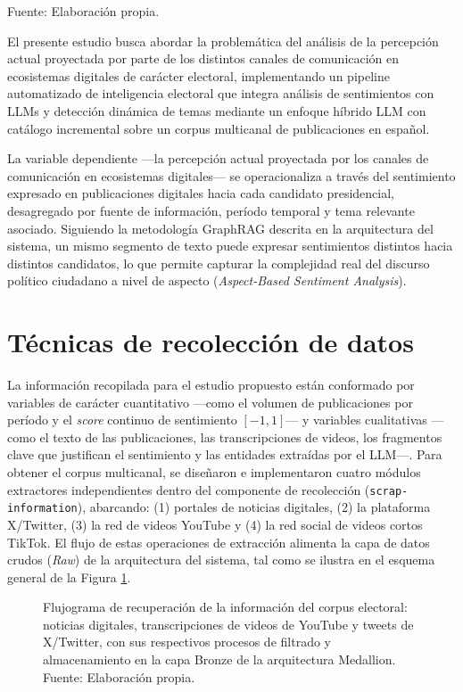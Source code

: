 \endgroup
\begin{flushleft}
    \small Fuente: Elaboración propia.
\end{flushleft}
 
El presente estudio busca abordar la problemática del análisis de la percepción actual proyectada por parte de los distintos canales de comunicación en ecosistemas digitales de carácter electoral, implementando un pipeline automatizado de inteligencia electoral que integra análisis de sentimientos con LLMs y detección dinámica de temas mediante un enfoque híbrido LLM con catálogo incremental sobre un corpus multicanal de publicaciones en español.

La variable dependiente —la percepción actual proyectada por los canales de comunicación en ecosistemas digitales— se operacionaliza a través del
sentimiento expresado en publicaciones digitales hacia cada candidato presidencial,
desagregado por fuente de información, período temporal y tema relevante asociado.
Siguiendo la metodología GraphRAG descrita en la arquitectura del sistema, un mismo
segmento de texto puede expresar sentimientos distintos hacia distintos candidatos, lo que
permite capturar la complejidad real del discurso político ciudadano a nivel de aspecto
(\textit{Aspect-Based Sentiment Analysis}).
 
\section{Técnicas de recolección de datos}
 
La información recopilada para el estudio propuesto están conformado por variables de carácter cuantitativo —como el volumen de publicaciones por período y el \textit{score} continuo de sentimiento $[-1, 1]$— y variables cualitativas —como el texto de las publicaciones, las transcripciones de videos, los fragmentos clave que justifican el sentimiento y las entidades extraídas por el LLM—. Para obtener el corpus multicanal, se diseñaron e implementaron cuatro módulos extractores independientes dentro del componente de recolección (\texttt{scrap-information}), abarcando: (1) portales de noticias digitales, (2) la plataforma X/Twitter, (3) la red de videos YouTube y (4) la red social de videos cortos TikTok. El flujo de estas operaciones de extracción alimenta la capa de datos crudos (\textit{Raw}) de la arquitectura del sistema, tal como se ilustra en el esquema general de la Figura \ref{4:fig1}.
 
\begin{figure}[!ht]
    \begin{center}
        \resizebox{0.95\textwidth}{!}{}
        \caption[Flujograma de recolección de los conjuntos de datos del corpus electoral]{Flujograma de recuperación de la información del corpus electoral: noticias digitales, transcripciones de videos de YouTube y tweets de X/Twitter, con sus respectivos procesos de filtrado y almacenamiento en la capa Bronze de la arquitectura Medallion.\\
            Fuente: Elaboración propia.}
        \label{4:fig1}
    \end{center}
\end{figure}
 
